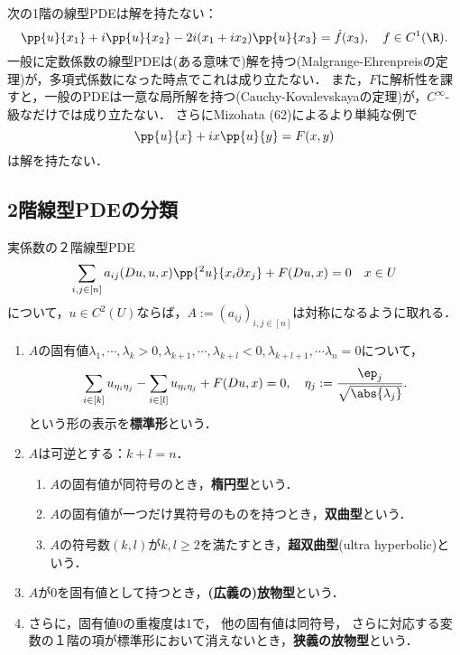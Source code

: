 \documentclass[uplatex,dvipdfmx]{jsreport}
\begin{document}
\begin{example}
    次の1階の線型PDEは解を持たない：
    \[\pp{u}{x_1}+i\pp{u}{x_2}-2i(x_1+ix_2)\pp{u}{x_3}=\dot{f}(x_3),\quad f\in C^1(\R).\]
    一般に定数係数の線型PDEは(ある意味で)解を持つ(Malgrange-Ehrenpreisの定理)が，多項式係数になった時点でこれは成り立たない．
    また，$F$に解析性を課すと，一般のPDEは一意な局所解を持つ(Cauchy-Kovalevskayaの定理)が，$C^\infty$-級なだけでは成り立たない．
    さらにMizohata (62)によるより単純な例で
    \[\pp{u}{x}+ix\pp{u}{y}=F(x,y)\]
    は解を持たない．
\end{example}

\subsection{2階線型PDEの分類}

\begin{definition}[2階線型PDEのPetrowskiの分類]
    実係数の２階線型PDE
    \[\sum_{i,j\in[n]}a_{ij}(Du,u,x)\pp{^2u}{x_i\partial x_j}+F(Du,x)=0\quad x\in U\]
    について，$u\in C^2(U)$ならば，$A:=(a_{ij})_{i,j\in[n]}$は対称になるように取れる．
    \begin{enumerate}
        \item $A$の固有値$\lambda_1,\cdots,\lambda_k>0,\lambda_{k+1},\cdots,\lambda_{k+l}<0,\lambda_{k+l+1},\cdots\lambda_n=0$について，
        \[\sum_{i\in[k]}u_{\eta_i\eta_j}-\sum_{i\in[l]}u_{\eta_i\eta_j}+F(Du,x)=0,\quad\eta_j:=\frac{\ep_j}{\sqrt{\abs{\lambda_j}}}.\]
        という形の表示を\textbf{標準形}という．
        \item $A$は可逆とする：$k+l=n$．
        \begin{enumerate}
            \item $A$の固有値が同符号のとき，\textbf{楕円型}という．
            \item $A$の固有値が一つだけ異符号のものを持つとき，\textbf{双曲型}という．
            \item $A$の符号数$(k,l)$が$k,l\ge 2$を満たすとき，\textbf{超双曲型}(ultra hyperbolic)という．
        \end{enumerate}
        \item $A$が$0$を固有値として持つとき，\textbf{(広義の)放物型}という．
        \item さらに，固有値$0$の重複度は$1$で，
        他の固有値は同符号，
        さらに対応する変数の１階の項が標準形において消えないとき，\textbf{狭義の放物型}という．
    \end{enumerate}
\end{definition}
\end{document}
